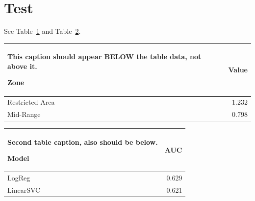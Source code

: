 \documentclass{article}
\makeatletter
\let\LT@OldCaption\caption
\let\LT@DeferredCaption\@empty
\renewcommand{\caption}{%
    \protected@edef\LT@DeferredCaption{\noexpand\LT@OldCaption}%
    \@bsphack
    \@dblarg{\LT@stash@caption}%
  }%
\newcommand{\LT@stash@caption}[2][]{%
  \gdef\LT@stash@opt{#1}%
  \gdef\LT@stash@txt{#2}%
  \@esphack
}
\makeatother
\begin{document}
\section{Test}

See Table~\ref{tbl-test} and Table~\ref{tbl-test2}.

\begin{longtable}[]{@{}lr@{}}

\caption{\label{tbl-test}This caption should appear BELOW the table data, not above it.}

\toprule
Zone & Value \\
\midrule
\endhead
\bottomrule
\endlastfoot
Restricted Area & 1.232 \\
Mid-Range & 0.798 \\

\end{longtable}

\begin{longtable}[]{@{}lr@{}}

\caption{\label{tbl-test2}Second table caption, also should be below.}

\toprule
Model & AUC \\
\midrule
\endhead
\bottomrule
\endlastfoot
LogReg & 0.629 \\
LinearSVC & 0.621 \\

\end{longtable}
\end{document}
